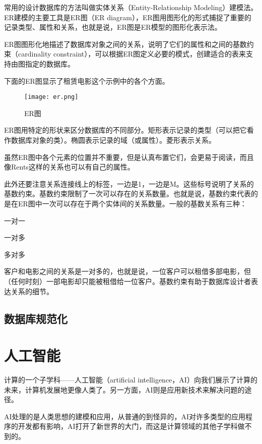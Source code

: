 常用的设计数据库的方法叫做实体关系（Entity-Relationship Modeling）建模法。ER建模的主要工具是ER图（ER diagram），ER图用图形化的形式捕捉了重要的记录类型、属性和关系，也就是说，ER图是ER模型的图形化表示法。

ER图图形化地描述了数据库对象之间的关系，说明了它们的属性和之间的基数约束（cardinality constraint），可以根据ER图定义必要的模式，创建适合的表来支持由图指定的数据库。


下面的ER图显示了租赁电影这个示例中的各个方面。

\begin{figure}[!h]
\centering
\texttt{[image: er.png]}
\caption{ER图}
\label{database_design}
\end{figure}

ER图用特定的形状来区分数据库的不同部分。矩形表示记录的类型（可以把它看作数据库对象的类）。椭圆表示记录的域（或属性）。菱形表示关系。

虽然ER图中各个元素的位置并不重要，但是认真布置它们，会更易于阅读，而且像Rents这样的关系也可以有自己的属性。

此外还要注意关系连接线上的标签，一边是1，一边是M。这些标号说明了关系的基数约束。基数约束限制了一次可以存在的关系数量。也就是说，基数约束代表的是在ER图中一次可以存在于两个实体间的关系数量。一般的基数关系有三种：

\begin{compactitem}
\item 一对一
\item 一对多
\item 多对多
\end{compactitem}

客户和电影之间的关系是一对多的，也就是说，一位客户可以租借多部电影，但（任何时刻）一部电影却只能被租借给一位客户。基数约束有助于数据库设计者表达关系的细节。


\section{数据库规范化}




\chapter{人工智能}


计算的一个子学科——人工智能（artificial intelligence，AI）向我们展示了计算的未来，计算机发展地更像人类了。另一方面，AI则是应用新技术来解决问题的途径。

AI处理的是人类思想的建模和应用，从普通的到怪异的，AI对许多类型的应用程序的开发都有影响，AI打开了新世界的大门，而这是计算领域的其他子学科做不到的。

